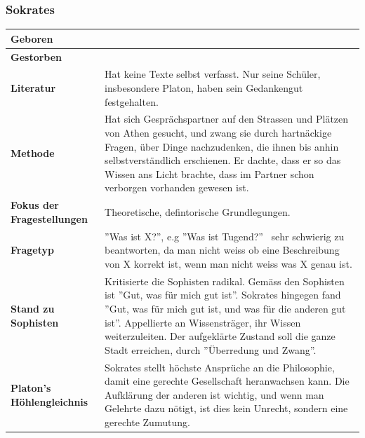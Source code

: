 		\subsubsection{Sokrates}
			\begin{longtable}{>{\bfseries}p{}p{}}
				\hline
				Geboren
					& \\
				\hline
				Gestorben
					& \\
				\hline
				Literatur
					& Hat keine Texte selbst verfasst.\newline
						Nur seine Schüler, insbesondere Platon, haben sein Gedankengut festgehalten.\\
				\hline
				Methode
					& Hat sich Gesprächspartner auf den Strassen und Plätzen von Athen gesucht, und zwang sie durch hartnäckige Fragen, über Dinge nachzudenken, die ihnen bis anhin selbstverständlich erschienen.\newline
						Er dachte, dass er so das Wissen ans Licht brachte, dass im Partner schon verborgen vorhanden gewesen ist.\\
				\hline
				Fokus der Fragestellungen
					& Theoretische, defintorische Grundlegungen.\\
				\hline
				Fragetyp
					& ''Was ist X?'', e.g ''Was ist Tugend?''\newline
						\textrightarrow\ sehr schwierig zu beantworten, da man nicht weiss ob eine Beschreibung von X korrekt ist, wenn man nicht weiss was X genau ist.\\
				\hline
				Stand zu Sophisten
					& Kritisierte die Sophisten radikal.\newline
					  Gemäss den Sophisten ist ''Gut, was für mich gut ist''.\newline
					  Sokrates hingegen fand ''Gut, was für mich gut ist, und was für die anderen gut ist''.\newline
					  Appellierte an Wissensträger, ihr Wissen weiterzuleiten.\newline
					  Der aufgeklärte Zustand soll die ganze Stadt erreichen, durch ''Überredung und Zwang''.\\
				\hline
				Platon's Höhlengleichnis
					& Sokrates stellt höchste Ansprüche an die Philosophie, damit eine gerechte Gesellschaft heranwachsen kann. Die Aufklärung der anderen ist wichtig, und wenn man Gelehrte dazu nötigt, ist dies kein Unrecht, sondern eine gerechte Zumutung.\\
				\hline
			\end{longtable}	
			
